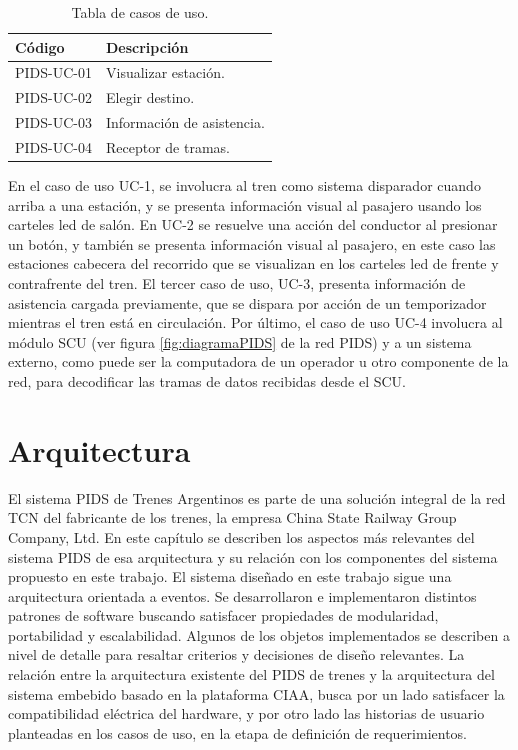 \begin{table}[htb]
\caption{Tabla de casos de uso.}
\label{tab:UseCases}
\begin{center}
\begin{tabular}{|l|l|}
\hline
\textbf{Código} & \textbf{Descripción}     \\ \hline
PIDS-UC-01  & Visualizar estación.         \\ \hline
PIDS-UC-02  & Elegir destino.             \\ \hline
PIDS-UC-03  & Información de asistencia. \\ \hline
PIDS-UC-04  & Receptor de tramas.       \\ \hline
\end{tabular}
\end{center}
\end{table}

En el caso de uso UC-1, se involucra al tren como sistema disparador cuando arriba a una estación, y se presenta información visual al pasajero usando los carteles led de salón. En UC-2 se resuelve una acción del conductor al presionar un botón, y también se presenta información visual al pasajero, en este caso las estaciones cabecera del recorrido que se visualizan en los carteles led de frente y contrafrente del tren. El tercer caso de uso, UC-3, presenta información de asistencia cargada previamente, que se dispara por acción de un temporizador mientras el tren está en circulación. Por último, el caso de uso UC-4 involucra al módulo SCU (ver figura  \ref{fig:diagramaPIDS} de la red PIDS) y a un sistema externo, como puede ser la computadora de un operador u otro componente de la red, para decodificar las tramas de datos recibidas desde el SCU.\\

\section{Arquitectura}

El sistema PIDS de Trenes Argentinos es parte de una solución integral de la red TCN del fabricante de los trenes, la empresa China State Railway Group Company, Ltd. En este capítulo se describen los aspectos más relevantes del sistema PIDS de esa arquitectura y su relación con los componentes del sistema propuesto en este trabajo. El sistema diseñado en este trabajo sigue una arquitectura orientada a eventos. Se desarrollaron e implementaron distintos patrones de software buscando satisfacer propiedades de modularidad, portabilidad y escalabilidad. Algunos de los objetos implementados se describen a nivel de detalle para resaltar criterios y decisiones de diseño relevantes. La relación entre la arquitectura existente del PIDS de trenes y la arquitectura del sistema embebido basado en la plataforma CIAA, busca por un lado satisfacer la compatibilidad eléctrica del hardware, y por otro lado las historias de usuario planteadas en los casos de uso, en la etapa de definición de requerimientos. \\

